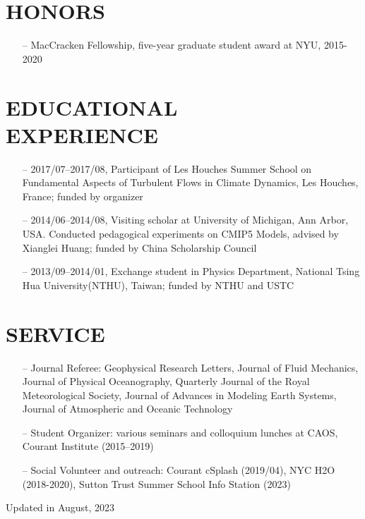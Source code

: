 \documentclass[margin]{res}
\begin{document}
\begin{resume}
\section{{\normalfont HONORS}}\begin{itemize}[leftmargin=*,noitemsep]
\item[--]{MacCracken Fellowship, five-year graduate student award at NYU, 2015-2020}
\end{itemize}


\section{{\normalfont EDUCATIONAL \\EXPERIENCE}}
\begin{itemize}[leftmargin=*,noitemsep]
\item[--] {2017/07--2017/08, Participant of Les Houches Summer School on Fundamental Aspects of Turbulent Flows in Climate Dynamics, Les Houches, France; funded by organizer}
\item[--]{2014/06--2014/08, Visiting scholar at University of Michigan, Ann Arbor, USA. Conducted pedagogical experiments on CMIP5 Models, advised by Xianglei Huang; funded by China Scholarship Council }
\item[--]{2013/09--2014/01, Exchange student in Physics Department, National Tsing Hua University(NTHU), Taiwan; }funded by NTHU and USTC 
\end{itemize}
 
 
\section{{\normalfont SERVICE}}
\begin{itemize}[leftmargin=*,noitemsep]
\item[--]{Journal Referee: Geophysical Research Letters, Journal of Fluid Mechanics, Journal of Physical Oceanography, Quarterly Journal of the Royal Meteorological Society, Journal of Advances in Modeling Earth Systems, Journal of Atmospheric and Oceanic Technology}
\item[--]{Student Organizer: various seminars and colloquium lunches at CAOS, Courant Institute (2015--2019)}
\item[--]{Social Volunteer and outreach: Courant cSplash (2019/04), NYC H2O (2018-2020), Sutton Trust Summer School Info Station (2023)}
\end{itemize}
\end{resume}


\begin{flushright}
Updated in August, 2023
\end{flushright}

\end{document}
